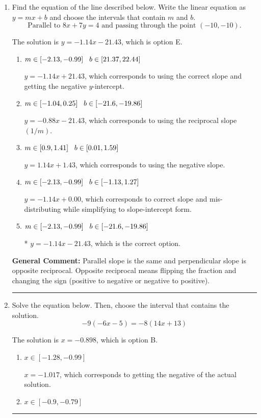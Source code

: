 \documentclass{extbook}[14pt]
\newcommand{\litem}[1]{\item #1

\rule{\textwidth}{0.4pt}}
\begin{document}
\begin{enumerate}\litem{
Find the equation of the line described below. Write the linear equation as $ y=mx+b $ and choose the intervals that contain $m$ and $b$.
\[ \text{Parallel to } 8 x + 7 y = 4 \text{ and passing through the point } (-10, -10). \]

The solution is \( y = -1.14x - 21.43 \), which is option E.\begin{enumerate}[label=\Alph*.]
\item \( m \in [-2.13, -0.99] \hspace*{3mm} b \in [21.37, 22.44] \)

 $y = -1.14x + 21.43$, which corresponds to using the correct slope and getting the negative $y$-intercept.
\item \( m \in [-1.04, 0.25] \hspace*{3mm} b \in [-21.6, -19.86] \)

 $y = -0.88x - 21.43$, which corresponds to using the reciprocal slope $(1/m)$.
\item \( m \in [0.9, 1.41] \hspace*{3mm} b \in [0.01, 1.59] \)

 $y = 1.14x + 1.43$, which corresponds to using the negative slope.
\item \( m \in [-2.13, -0.99] \hspace*{3mm} b \in [-1.13, 1.27] \)

 $y = -1.14x + 0.00$, which corresponds to correct slope and mis-distributing while simplifying to slope-intercept form.
\item \( m \in [-2.13, -0.99] \hspace*{3mm} b \in [-21.6, -19.86] \)

* $y = -1.14x - 21.43$, which is the correct option.
\end{enumerate}

\textbf{General Comment:} Parallel slope is the same and perpendicular slope is opposite reciprocal. Opposite reciprocal means flipping the fraction and changing the sign (positive to negative or negative to positive).
}
\litem{
Solve the equation below. Then, choose the interval that contains the solution.
\[ -9(-6x -5) = -8(14x + 13) \]

The solution is \( x = -0.898 \), which is option B.\begin{enumerate}[label=\Alph*.]
\item \( x \in [-1.28, -0.99] \)

$x = -1.017$, which corresponds to getting the negative of the actual solution.
\item \( x \in [-0.9, -0.79] \)


\end{enumerate}}
\end{enumerate}
\end{document}
